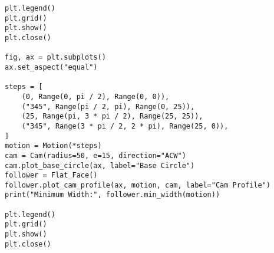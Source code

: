 \documentclass[12pt]{article}
\begin{document}
\begin{lstlisting}
plt.legend()
plt.grid()
plt.show()
plt.close()

fig, ax = plt.subplots()
ax.set_aspect("equal")

steps = [
    (0, Range(0, pi / 2), Range(0, 0)),
    ("345", Range(pi / 2, pi), Range(0, 25)),
    (25, Range(pi, 3 * pi / 2), Range(25, 25)),
    ("345", Range(3 * pi / 2, 2 * pi), Range(25, 0)),
]
motion = Motion(*steps)
cam = Cam(radius=50, e=15, direction="ACW")
cam.plot_base_circle(ax, label="Base Circle")
follower = Flat_Face()
follower.plot_cam_profile(ax, motion, cam, label="Cam Profile")
print("Minimum Width:", follower.min_width(motion))

plt.legend()
plt.grid()
plt.show()
plt.close()
\end{lstlisting}
\end{document}
